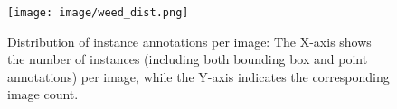 \begin{figure}[ht]
\centering
\texttt{[image: image/weed\_dist.png]}
\caption{Distribution of instance annotations per image: The X-axis shows the number of instances (including both bounding box and point annotations) per image, while the Y-axis indicates the corresponding image count.} 
\label{dist_weed}
\end{figure}

